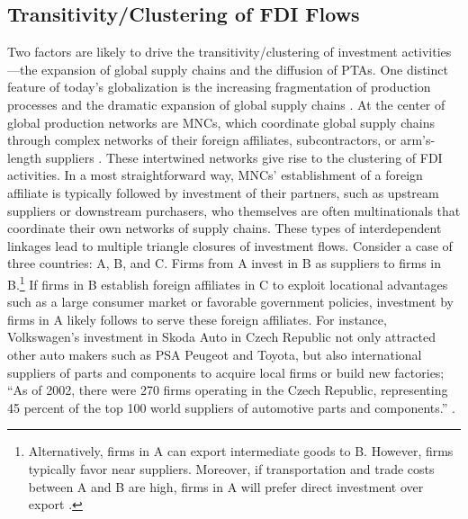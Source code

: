 \documentclass{article}
\begin{document}
\subsection{Transitivity/Clustering of FDI Flows}
Two factors are likely to drive the transitivity/clustering of investment activities---the expansion of global supply chains and the diffusion of PTAs.  One distinct feature of today's globalization is the increasing fragmentation of production processes and the dramatic expansion of global supply chains \citep{UNCTAD:2013}. At the center of global production networks are MNCs, which coordinate global supply chains through complex networks of their foreign affiliates, subcontractors, or arm's-length suppliers \citep[xxii]{UNCTAD:2013}. These intertwined networks give rise to the clustering of FDI activities. In a most straightforward way, MNCs' establishment of a foreign affiliate is typically followed by investment of their partners, such as upstream suppliers or downstream purchasers, who themselves are often multinationals that coordinate their own networks of supply chains. These types of interdependent linkages lead to multiple triangle closures of investment flows. Consider a case of three countries: A, B, and C. Firms from A invest in B as suppliers to firms in B.\footnote{Alternatively, firms in A can export intermediate goods to B. However, firms typically favor near suppliers. Moreover, if transportation and trade costs between A and B are high, firms in A will prefer direct investment over export \citep{Carr_et_al:2001}. } If firms in B establish foreign affiliates in C to exploit locational advantages such as a large consumer market or favorable government policies, investment by firms in A likely follows to serve these foreign affiliates. For instance, Volkswagen's investment in Skoda Auto in Czech Republic not only attracted other auto makers such as PSA Peugeot and Toyota, but also international suppliers of parts and components to acquire local firms or build new factories; ``As of 2002, there were 270 firms operating in the Czech Republic, representing 45 percent of the top 100 world suppliers of automotive parts and components.'' \citep[352]{Kaminski_Javorcik:2005}.
\end{document}
